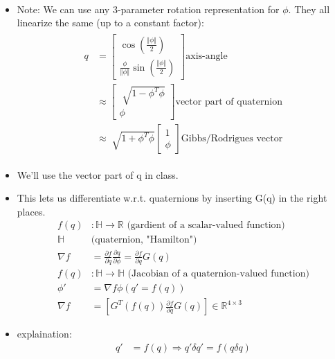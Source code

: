\begin{itemize}
\begin{align}
    \end{align}
    \item Note: We can use any 3-parameter rotation representation for $\phi$. They all linearize the same (up to a constant factor):
    \begin{align}
        \begin{split}
            q & = \begin{bmatrix}
                \cos(\frac{\Vert \phi \Vert}{2}) \\ \frac{\phi}{\Vert \phi \Vert} \sin(\frac{\Vert \phi \Vert}{2})
            \end{bmatrix} \text{axis-angle} \\
            & \approx 
            \begin{bmatrix}
                \sqrt[]{1 - \phi^T \phi} \\ \phi
            \end{bmatrix} \text{vector part of quaternion} \\
            & \approx \sqrt[]{1 + \phi^T \phi}
            \begin{bmatrix}
                1 \\ \phi
            \end{bmatrix} \text{Gibbs/Rodrigues vector}
        \end{split} 
    \end{align}
    \item We'll use the vector part of q in class.
    \item This lets us differentiate w.r.t. quaternions by inserting G(q) in the right places.
    \begin{align}
        f(q) &: \mathbb{H} \to \mathbb{R} \text{ (gardient of a scalar-valued function)} \\
        \mathbb{H} & \text{(quaternion, "Hamilton")} \\
        \nabla f &= \frac{\partial f}{\partial q} \frac{\partial q}{\partial \phi} = \frac{\partial f}{\partial q} G(q) \\
        f(q) &: \mathbb{H} \to \mathbb{H} \text{ (Jacobian of a quaternion-valued function)} \\
        \phi' & = \nabla f \phi (q' = f(q))\\
        \nabla f & = [G^T(f(q)) \frac{\partial f}{\partial q} G(q) ] \in \mathbb{R}^{4 \times 3}
    \end{align}
    \item explaination:
    \begin{align}
        q' &= f(q) \Rightarrow q' \delta q' = f(q \delta q) \\

\end{align}
\end{itemize}
